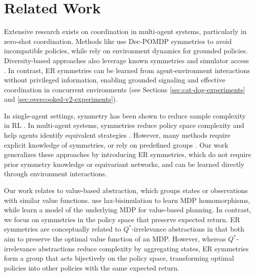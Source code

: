 \section{Related Work}
Extensive research exists on coordination in multi-agent systems, particularly in zero-shot coordination. Methods like \citet{hu2020other, muglich2022equivariant} use Dec-POMDP symmetries to avoid incompatible policies, while \citet{hu2021off} rely on environment dynamics for grounded policies. Diversity-based approaches also leverage known symmetries and simulator access \citep{cui2023adversarial, lupu2021trajectory}. In contrast, ER symmetries can be learned from agent-environment interactions without privileged information, enabling grounded signaling and effective coordination in concurrent environments (see Sections \ref{sec:cat-dog-experiments} and \ref{sec:overcooked-v2-experiments}).

In single-agent settings, symmetry has been shown to reduce sample complexity in RL \citep{van2020mdp, zhu2022sample, nguyen2024symmetry}. In multi-agent systems, symmetries reduce policy space complexity and help agents identify equivalent strategies \citep{van2021multi, muglich2022equivariant}. However, many methods require explicit knowledge of symmetries, or rely on predefined groups \citep{abreu2023addressing, yu2024leveraging, nguyen2024symmetry}. Our work generalizes these approaches by introducing ER symmetries, which do not require prior symmetry knowledge or equivariant networks, and can be learned directly through environment interactions.

Our work relates to value-based abstraction, which groups states or observations with similar value functions. \citet{rezaei2022continuous} use lax-bisimulation to learn MDP homomorphisms, while \citet{grimm2021proper} learn a model of the underlying MDP for value-based planning. In contrast, we focus on symmetries in the policy space that preserve expected return. ER symmetries are conceptually related to $Q^*$-irrelevance abstractions \citep{li2006towards} in that both aim to preserve the optimal value function of an MDP. However, whereas $Q^*$-irrelevance abstractions reduce complexity by aggregating states, ER symmetries form a group that acts bijectively on the policy space, transforming optimal policies into other policies with the same expected return.